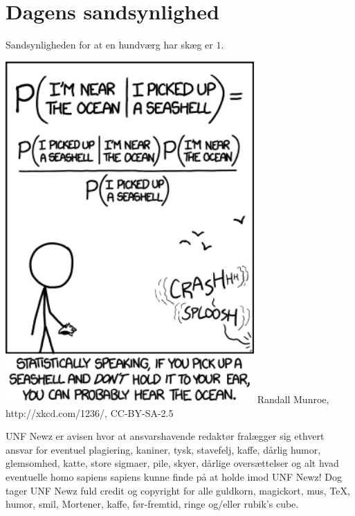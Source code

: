 \begin{minipage}[b]{0.95\linewidth}
\begin{minipage}[t]{0.47\textwidth}
\vspace{-2mm}
\section*{Dagens sandsynlighed}
Sandsynligheden for at en hundværg har skæg er $1$.

\vspace{1mm}
\includegraphics[width=95mm]{seashell.png}
\tiny Randall Munroe, http://xkcd.com/1236/, CC-BY-SA-2.5
\end{minipage}

\begin{center}
\tiny UNF Newz er avisen hvor at ansvarshavende redaktør fralægger sig ethvert ansvar for eventuel plagiering, kaniner, tysk, stavefelj, kaffe, dårlig humor, glemsomhed, katte, store sigmaer, pile, skyer, dårlige oversættelser og alt hvad eventuelle homo sapiens sapiens kunne finde på at holde imod UNF Newz! Dog tager UNF Newz fuld credit og copyright for alle guldkorn, magickort, mus, \TeX, humor, smil, Mortener, kaffe, før-fremtid, ringe og/eller rubik's cube.
\end{center}
\end{minipage}

